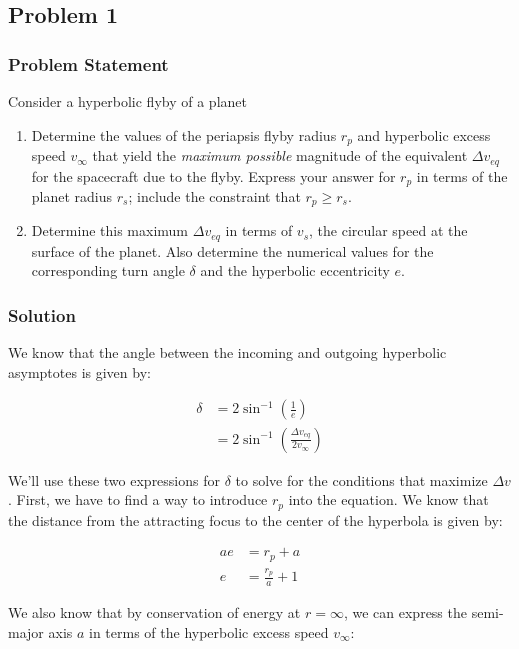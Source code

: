 \subsection{Problem 1}

\subsubsection{Problem Statement}
Consider a hyperbolic flyby of a planet

\begin{enumerate}
    \item Determine the values of the periapsis flyby radius $r_p$ and hyperbolic excess speed $v_\infty$ that yield the \textit{maximum possible} magnitude of the equivalent $\Delta v_{eq}$ for the spacecraft due to the flyby. Express your answer for $r_p$ in terms of the planet radius $r_s$; include the constraint that $r_p \geq r_s$.
    \item Determine this maximum $\Delta v_{eq}$ in terms of $v_s$, the circular speed at the surface of the planet. Also determine the numerical values for the corresponding turn angle $\delta$ and the hyperbolic eccentricity $e$.
\end{enumerate}

\subsubsection{Solution}

We know that the angle between the incoming and outgoing hyperbolic asymptotes is given by:

\begin{align*}
    \delta &= 2 \sin^{-1} \left( \frac{1}{e} \right) \\
    &= 2 \sin^{-1} \left( \frac{\Delta v_{eq}}{2 v_\infty} \right)
\end{align*}

We'll use these two expressions for $\delta$ to solve for the conditions that maximize $\Delta v$. First, we have to find a way to introduce $r_p$ into the equation. We know that the distance from the attracting focus to the center of the hyperbola is given by:

\begin{align*}
    ae &= r_p + a \\
    e &= \frac{r_p}{a} + 1
\end{align*}

We also know that by conservation of energy at $r=\infty$, we can express the semi-major axis $a$ in terms of the hyperbolic excess speed $v_\infty$:

